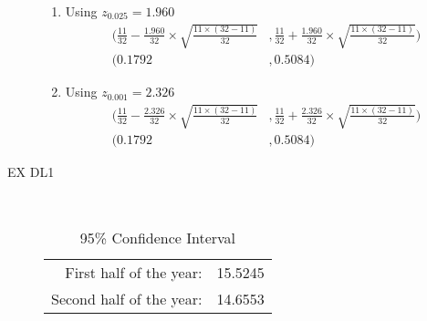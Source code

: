 \documentclass[letterpaper,10pt]{article}
\begin{document}
\begin{description}
\begin{enumerate}
\item Using $z_{0.025} = 1.960$
\begin{align*}
(\frac{11}{32}-\frac{1.960}{32}\times\sqrt{\frac{11\times(32-11)}{32}}&,
\frac{11}{32}+\frac{1.960}{32}\times\sqrt{\frac{11\times(32-11)}{32}}) \\
(0.1792 &, 0.5084)
\end{align*}

\item Using $z_{0.001} = 2.326$
\begin{align*}
(\frac{11}{32}-\frac{2.326}{32}\times\sqrt{\frac{11\times(32-11)}{32}}&,
\frac{11}{32}+\frac{2.326}{32}\times\sqrt{\frac{11\times(32-11)}{32}}) \\
(0.1792 &, 0.5084)
\end{align*}
\end{enumerate}

\item[EX DL1]\ 
\begin{center}
\begin{table}[ht]
\caption{95\% Confidence Interval} %
\centering  %
\begin{tabular}{r l} %
\hline\hline                   %
First half of the year: & 15.5245 \\ %
Second half of the year: & 14.6553 \\ [1ex]      %
\hline %
\end{tabular}
\label{table:nonlin} %
\end{table}
\end{center}

\end {description}
\end{document}
